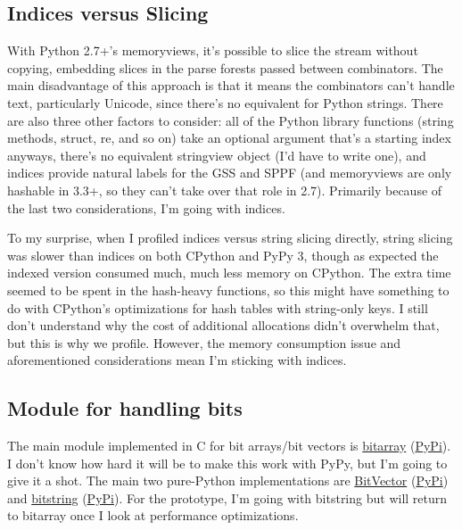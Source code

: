\documentclass[12pt]{article}
\begin{document}
\subsection{Indices versus Slicing}
\label{sec:indices_slicing}

With Python 2.7+'s memoryviews, it's possible to slice the stream
without copying, embedding slices in the parse forests passed between
combinators.  The main disadvantage of this approach is that it means
the combinators can't handle text, particularly Unicode, since there's
no equivalent for Python strings.  There are also three other factors
to consider: all of the Python library functions (string methods,
struct, re, and so on) take an optional argument that's a starting
index anyways, there's no equivalent stringview object (I'd have to
write one), and indices provide natural labels for the GSS and SPPF
(and memoryviews are only hashable in 3.3+, so they can't take over
that role in 2.7).  Primarily because of the last two considerations,
I'm going with indices.

To my surprise, when I profiled indices versus string slicing
directly, string slicing was slower than indices on both CPython and
PyPy 3, though as expected the indexed version consumed much, much
less memory on CPython.  The extra time seemed to be spent in the
hash-heavy functions, so this might have something to do with
CPython's optimizations for hash tables with string-only keys.  I
still don't understand why the cost of additional allocations didn't
overwhelm that, but this is why we profile.  However, the memory
consumption issue and aforementioned considerations mean I'm sticking
with indices.


\subsection{Module for handling bits}
\label{sec:bits_module}

The main module implemented in C for bit arrays/bit vectors is
\href{https://github.com/ilanschnell/bitarray}{bitarray}
(\href{https://pypi.python.org/pypi/bitarray/}{PyPi}).  I don't know
how hard it will be to make this work with PyPy, but I'm going to give
it a shot.  The main two pure-Python implementations are
\href{https://engineering.purdue.edu/kak/dist/BitVector-3.3.2.html}{BitVector}
(\href{https://pypi.python.org/pypi/BitVector/3.3.2}{PyPi}) and
\href{https://code.google.com/p/python-bitstring/}{bitstring}
(\href{https://pypi.python.org/pypi/bitstring/3.1.3}{PyPi}).  For the
prototype, I'm going with bitstring but will return to bitarray once I
look at performance optimizations.
\end{document}
